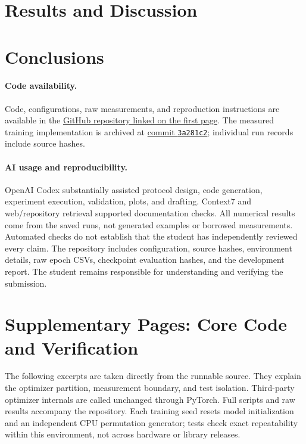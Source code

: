 \documentclass[10pt,a4paper,twocolumn]{article}
\begin{document}

\section{Results and Discussion}


\section{Conclusions}


\paragraph{Code availability.}
Code, configurations, raw measurements, and reproduction instructions are available in the \href{https://github.com/XFDG/cie6007-optimizer-benchmark}{GitHub repository linked on the first page}. The measured training implementation is archived at \href{https://github.com/XFDG/cie6007-optimizer-benchmark/tree/3a281c2}{commit \texttt{3a281c2}}; individual run records include source hashes.

\paragraph{AI usage and reproducibility.}
OpenAI Codex \cite{codex} substantially assisted protocol design, code generation, experiment execution, validation, plots, and drafting. Context7 and web/repository retrieval supported documentation checks. All numerical results come from the saved runs, not generated examples or borrowed measurements. Automated checks do not establish that the student has independently reviewed every claim. The repository includes configuration, source hashes, environment details, raw epoch CSVs, checkpoint evaluation hashes, and the development report. The student remains responsible for understanding and verifying the submission.

\newpage
{\normalsize}
\clearpage
\onecolumn
\section*{Supplementary Pages: Core Code and Verification}
The following excerpts are taken directly from the runnable source. They explain the optimizer partition, measurement boundary, and test isolation. Third-party optimizer internals are called unchanged through PyTorch. Full scripts and raw results accompany the repository. Each training seed resets model initialization and an independent CPU permutation generator; tests check exact repeatability within this environment, not across hardware or library releases.
\end{document}
